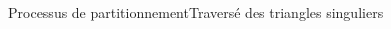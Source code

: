 \documentclass[compress,10pt,aspectratio=169]{beamer}
\begin{document}
\begin{frame}{Processus de partitionnement}{Traversé des triangles singuliers}
\begin{columns}
\begin{column}{0.7\textwidth}
\centering
{}
\end{column}
\end{columns}
\end{frame}
\end{document}

